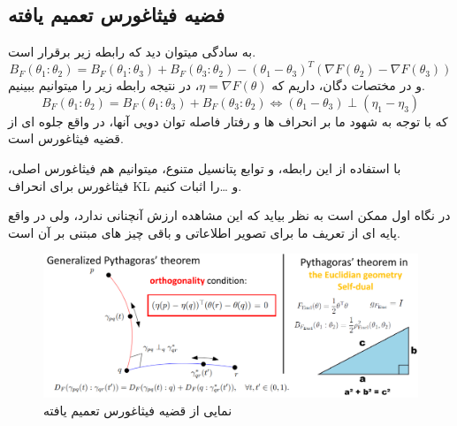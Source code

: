 \subsection{فضیه فیثاغورس تعمیم یافته}

به سادگی میتوان دید که رابطه زیر برقرار است.
$$B_F(\theta_1:\theta_2)=B_F(\theta_1:\theta_3)+B_F(\theta_3:\theta_2)-(\theta_1-\theta_3)^T(\nabla F(\theta_2)-\nabla F(\theta_3))$$
و در مختصات دگان، داریم که $\eta=\nabla F(\theta)$، در نتیجه رابطه زیر را میتوانیم ببینیم.
$$B_F(\theta_1:\theta_2)=B_F(\theta_1:\theta_3)+B_F(\theta_3:\theta_2)\iff(\theta_1-\theta_3)\perp(\eta_1-\eta_3)$$
که با توجه به شهود ما بر انحراف ها و رفتار فاصله توان دویی آنها، در واقع جلوه ای از قضیه فیثاغورس است.

با استفاده از این رابطه، و توابع پتانسیل متنوع، میتوانیم هم فیثاغورس اصلی، فیثاغورس برای انحراف KL و \dots را اثبات کنیم.

در نگاه اول ممکن است به نظر بیاید که این مشاهده ارزش آنچنانی ندارد، ولی در واقع پایه ای از تعریف ما برای تصویر اطلاعاتی و باقی چیز های مبتنی بر آن است.
\begin{figure}[h]
    \centering
    \includegraphics*[width=0.8\linewidth]{Pictures/Q4/pythagoras.png}
    \caption{نمایی از قضیه فیثاغورس تعمیم یافته}
\end{figure}